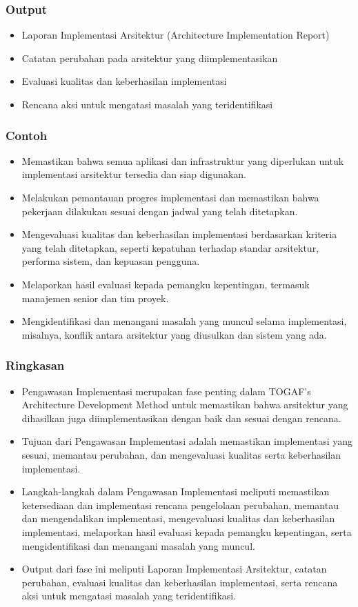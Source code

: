 \documentclass{beamer}
\begin{document}
	\begin{frame}
		\frametitle{Output}
		\begin{itemize}
			\item Laporan Implementasi Arsitektur (Architecture Implementation Report)
			\item Catatan perubahan pada arsitektur yang diimplementasikan
			\item Evaluasi kualitas dan keberhasilan implementasi
			\item Rencana aksi untuk mengatasi masalah yang teridentifikasi
		\end{itemize}
	\end{frame}
	
	\begin{frame}
		\frametitle{Contoh}
		\begin{itemize}
			\item Memastikan bahwa semua aplikasi dan infrastruktur yang diperlukan untuk implementasi arsitektur tersedia dan siap digunakan.
			\item Melakukan pemantauan progres implementasi dan memastikan bahwa pekerjaan dilakukan sesuai dengan jadwal yang telah ditetapkan.
			\item Mengevaluasi kualitas dan keberhasilan implementasi berdasarkan kriteria yang telah ditetapkan, seperti kepatuhan terhadap standar arsitektur, performa sistem, dan kepuasan pengguna.
			\item Melaporkan hasil evaluasi kepada pemangku kepentingan, termasuk manajemen senior dan tim proyek.
			\item Mengidentifikasi dan menangani masalah yang muncul selama implementasi, misalnya, konflik antara arsitektur yang diusulkan dan sistem yang ada.
		\end{itemize}
	\end{frame}

\begin{frame}
\frametitle{Ringkasan}
\begin{itemize}
\item Pengawasan Implementasi merupakan fase penting dalam TOGAF's Architecture Development Method untuk memastikan bahwa arsitektur yang dihasilkan juga diimplementasikan dengan baik dan sesuai dengan rencana.
\item Tujuan dari Pengawasan Implementasi adalah memastikan implementasi yang sesuai, memantau perubahan, dan mengevaluasi kualitas serta keberhasilan implementasi.
\item Langkah-langkah dalam Pengawasan Implementasi meliputi memastikan ketersediaan dan implementasi rencana pengelolaan perubahan, memantau dan mengendalikan implementasi, mengevaluasi kualitas dan keberhasilan implementasi, melaporkan hasil evaluasi kepada pemangku kepentingan, serta mengidentifikasi dan menangani masalah yang muncul.
\item Output dari fase ini meliputi Laporan Implementasi Arsitektur, catatan perubahan, evaluasi kualitas dan keberhasilan implementasi, serta rencana aksi untuk mengatasi masalah yang teridentifikasi.
\end{itemize}
\end{frame}
\end{document}

